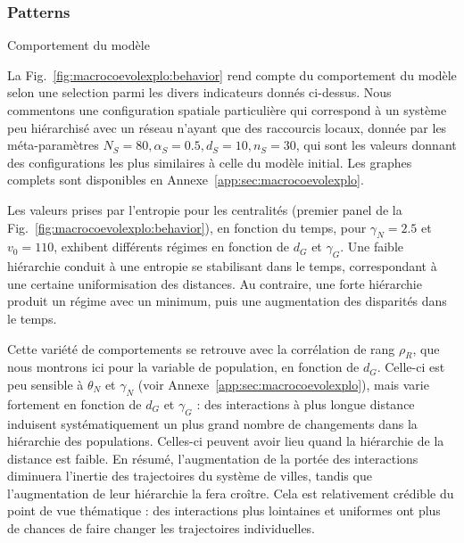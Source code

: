 \subsubsection{Patterns}{Comportement du modèle}



La Fig.~\ref{fig:macrocoevolexplo:behavior} rend compte du comportement du modèle selon une selection parmi les divers indicateurs donnés ci-dessus. Nous commentons une configuration spatiale particulière qui correspond à un système peu hiérarchisé avec un réseau n'ayant que des raccourcis locaux, donnée par les méta-paramètres $N_S=80,\alpha_S=0.5,d_S=10,n_S=30$, qui sont les valeurs donnant des configurations les plus similaires à celle du modèle initial. Les graphes complets sont disponibles en Annexe~\ref{app:sec:macrocoevolexplo}.


Les valeurs prises par l'entropie pour les centralités (premier panel de la Fig.~\ref{fig:macrocoevolexplo:behavior}), en fonction du temps, pour $\gamma_N = 2.5$ et $v_0 = 110$, exhibent différents régimes en fonction de $d_G$ et $\gamma_G$. Une faible hiérarchie conduit à une entropie se stabilisant dans le temps, correspondant à une certaine uniformisation des distances. Au contraire, une forte hiérarchie produit un régime avec un minimum, puis une augmentation des disparités dans le temps.


Cette variété de comportements se retrouve avec la corrélation de rang $\rho_R$, que nous montrons ici pour la variable de population, en fonction de $d_G$. Celle-ci est peu sensible à $\theta_N$ et $\gamma_N$ (voir Annexe~\ref{app:sec:macrocoevolexplo}), mais varie fortement en fonction de $d_G$ et $\gamma_G$ : des interactions à plus longue distance induisent systématiquement un plus grand nombre de changements dans la hiérarchie des populations. Celles-ci peuvent avoir lieu quand la hiérarchie de la distance est faible. En résumé, l'augmentation de la portée des interactions diminuera l'inertie des trajectoires du système de villes, tandis que l'augmentation de leur hiérarchie la fera croître. Cela est relativement crédible du point de vue thématique : des interactions plus lointaines et uniformes ont plus de chances de faire changer les trajectoires individuelles.


